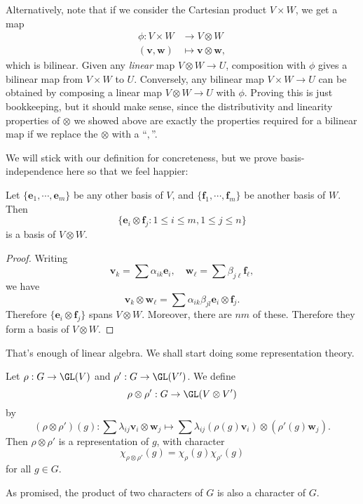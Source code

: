 \documentclass[a4paper]{article}
\begin{document}
Alternatively, note that if we consider the Cartesian product $V \times W$, we get a map
\begin{align*}
  \phi: V\times W &\to V \otimes W\\
  (\mathbf{v}, \mathbf{w}) &\mapsto \mathbf{v}\otimes \mathbf{w},
\end{align*}
which is bilinear. Given any \emph{linear} map $V \otimes W \to U$, composition with $\phi$ gives a bilinear map from $V \times W$ to $U$. Conversely, any bilinear map $V \times W \to U$ can be obtained by composing a linear map $V \otimes W \to U$ with $\phi$. Proving this is just bookkeeping, but it should make sense, since the distributivity and linearity properties of $\otimes$ we showed above are exactly the properties required for a bilinear map if we replace the $\otimes$ with a ``$,$''.

We will stick with our definition for concreteness, but we prove basis-independence here so that we feel happier:
\begin{lemma}
  Let $\{\mathbf{e}_1, \cdots, \mathbf{e}_m\}$ be any other basis of $V$, and $\{\mathbf{f}_1, \cdots, \mathbf{f}_m\}$ be another basis of $W$. Then
  \[
    \{\mathbf{e}_i \otimes \mathbf{f}_j: 1 \leq i \leq m, 1 \leq j \leq n\}
  \]
  is a basis of $V\otimes W$.
\end{lemma}

\begin{proof}
  Writing
  \[
    \mathbf{v}_k = \sum \alpha_{ik} \mathbf{e}_i,\quad \mathbf{w}_\ell = \sum \beta_{j\ell} \mathbf{f}_\ell,
  \]
  we have
  \[
    \mathbf{v}_k \otimes \mathbf{w}_\ell = \sum \alpha_{ik} \beta_{jl} \mathbf{e}_i \otimes \mathbf{f}_j.
  \]
  Therefore $\{\mathbf{e}_i \otimes \mathbf{f}_j\}$ spans $V \otimes W$. Moreover, there are $nm$ of these. Therefore they form a basis of $V\otimes W$.
\end{proof}

That's enough of linear algebra. We shall start doing some representation theory.
\begin{prop}
  Let $\rho: G \to \GL(V)$ and $\rho': G \to \GL(V')$. We define
  \[
    \rho \otimes \rho': G \to \GL(V\otimes V')
  \]
  by
  \[
    (\rho \otimes \rho')(g) : \sum \lambda_{ij} \mathbf{v}_i \otimes \mathbf{w}_j \mapsto \sum \lambda_{ij} (\rho(g)\mathbf{v}_i)\otimes (\rho'(g) \mathbf{w}_j).
  \]
  Then $\rho \otimes \rho'$ is a representation of $g$, with character
  \[
    \chi_{\rho\otimes \rho'}(g) = \chi_\rho(g) \chi_{\rho'}(g)
  \]
  for all $g \in G$.
\end{prop}
As promised, the product of two characters of $G$ is also a character of $G$.
\end{document}
